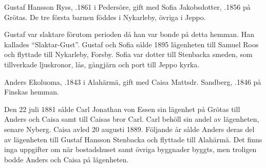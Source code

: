 Gustaf Hansson Ryss, .1861 i Pedersöre, gift med Sofia Jakobsdotter, .1856 på Grötas. De tre första barnen föddes i Nykarleby, övriga i Jeppo.
\begin{jhchildren}
  \item {}
  \item {}
  \item {}
  \item {}
  \item {}
  \item {}
  \item {}
\end{jhchildren}

Gustaf var slaktare förutom perioden då han var bonde på detta hemman. Han kallades ``Slaktar-Gust''. Gustaf och Sofia sålde 1895 lägenheten till Samuel Roos och flyttade till Nykarleby, Forsby. Sofia var dotter till Stenbacka smeden, som tillverkade ljuskronor, lås, gångjärn och port till Jeppo kyrka.


Anders Ekoluoma, .1843 i Alahärmä, gift med Caisa Mattsdr. Sandberg, .1846 på Finskas hemman.
\begin{jhchildren}
  \item {}
  \item {}
  \item {}
  \item {}
\end{jhchildren}

Den 22 juli 1881 sålde Carl Jonathan von Essen sin lägenhet på Grötas till Anders och Caisa samt till Caisas bror Carl. Carl behöll sin andel av lägenheten, senare Nyberg. Caisa avled 20 augusti 1889. Följande år sålde Anders deras del av lägenheten till Gustaf Hansson Stenbacka och flyttade till Alahärmä. Det finns inga uppgifter om när bostadshuset samt övriga byggnader byggts, men troligen bodde Anders och Caisa på lägenheten.


